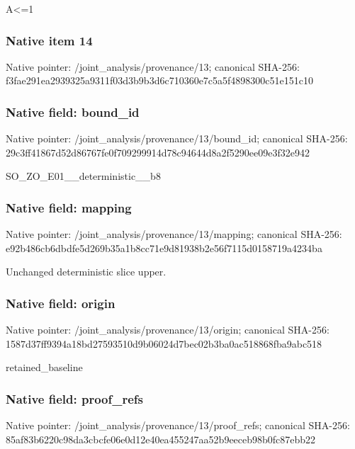 \documentclass[10pt,a4paper]{article}
\begin{document}
\begingroup\raggedright\sloppy A<=\allowbreak{}1\par\endgroup

\subsubsection{Native item 14}
Native pointer: /joint\_\allowbreak{}analysis/provenance/13; canonical SHA-256: f3fae291ea2939325a9311f03d3b9b3d6c710360e7c5a5f4898300c51e151c10

\subsubsection{Native field: bound\_\allowbreak{}id}
Native pointer: /joint\_\allowbreak{}analysis/provenance/13/bound\_\allowbreak{}id; canonical SHA-256: 29c3ff41867d52d86767fe0f709299914d78c94644d8a2f5290ee09e3f32e942

\begingroup\raggedright\sloppy SO\_\allowbreak{}ZO\_\allowbreak{}E01\_\allowbreak{}\_\allowbreak{}deterministic\_\allowbreak{}\_\allowbreak{}b8\par\endgroup

\subsubsection{Native field: mapping}
Native pointer: /joint\_\allowbreak{}analysis/provenance/13/mapping; canonical SHA-256: e92b486cb6dbdfe5d269b35a1b8cc71e9d81938b2e56f7115d0158719a4234ba

\begingroup\raggedright\sloppy Unchanged deterministic slice upper.\par\endgroup

\subsubsection{Native field: origin}
Native pointer: /joint\_\allowbreak{}analysis/provenance/13/origin; canonical SHA-256: 1587d37ff9394a18bd27593510d9b06024d7bec02b3ba0ac518868fba9abc518

\begingroup\raggedright\sloppy retained\_\allowbreak{}baseline\par\endgroup

\subsubsection{Native field: proof\_\allowbreak{}refs}
Native pointer: /joint\_\allowbreak{}analysis/provenance/13/proof\_\allowbreak{}refs; canonical SHA-256: 85af83b6220c98da3cbcfe06e0d12e40ea455247aa52b9eeceb98b0fc87ebb22
\end{document}
